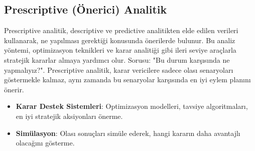 \subsection{Prescriptive (Önerici) Analitik}

Prescriptive analitik, descriptive ve predictive analitikten elde edilen verileri kullanarak, ne yapılması gerektiği konusunda önerilerde bulunur. Bu analiz yöntemi, optimizasyon teknikleri ve karar analitiği gibi ileri seviye araçlarla stratejik kararlar almaya yardımcı olur. Sorusu: "Bu durum karşısında ne yapmalıyız?". Prescriptive analitik, karar vericilere sadece olası senaryoları göstermekle kalmaz, aynı zamanda bu senaryolar karşısında en iyi eylem planını önerir.

\begin{itemize}
    \item \textbf{Karar Destek Sistemleri}: Optimizasyon modelleri, tavsiye algoritmaları, en iyi stratejik aksiyonları önerme.
    \item \textbf{Simülasyon}: Olası sonuçları simüle ederek, hangi kararın daha avantajlı olacağını gösterme.
\end{itemize}

\newpage
